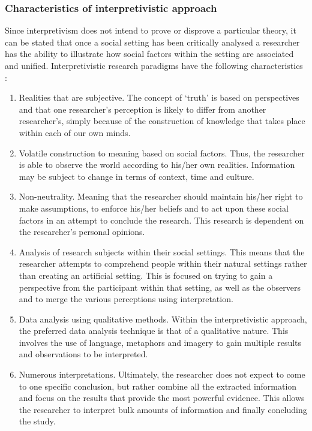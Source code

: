 \subsubsection{Characteristics of interpretivistic approach}
Since interpretivism does not intend to prove or disprove a particular theory, it can be stated that once a social setting has been critically analysed a researcher has the ability to illustrate how social factors within the setting are associated and unified. Interpretivistic research paradigms have the following characteristics \cite{OatesJ2006}: 
\begin{enumerate}[label=\roman*.]
\item Realities that are subjective. The concept of ‘truth’ is based on perspectives and that one researcher's perception is likely to differ from another researcher’s, simply because of the construction of knowledge that takes place within each of our own minds.
\item Volatile construction to meaning based on social factors. Thus, the researcher is able to observe the world according to his/her own realities. Information may be subject to change in terms of context, time and culture.
\item Non-neutrality. Meaning that the researcher should maintain his/her right to make assumptions, to enforce his/her beliefs and to act upon these social factors in an attempt to conclude the research. This research is dependent on the researcher’s personal opinions.
\item Analysis of research subjects within their social settings. This means that the researcher attempts to comprehend people within their natural settings rather than creating an artificial setting. This is focused on trying to gain a perspective from the participant within that setting, as well as the observers and to merge the various perceptions using interpretation.
\item Data analysis using qualitative methods. Within the interpretivistic approach, the preferred data analysis technique is that of a qualitative nature. This involves the use of language, metaphors and imagery to gain multiple results and observations to be interpreted.
\item Numerous interpretations. Ultimately, the researcher does not expect to come to one specific conclusion, but rather combine all the extracted information and focus on the results that provide the most powerful evidence. This allows the researcher to interpret bulk amounts of information and finally concluding the study.
\end{enumerate}

